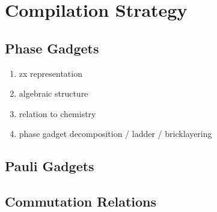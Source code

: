 \chapter{\label{compilation-strategy}Compilation Strategy}

\section{Phase Gadgets}
\begin{enumerate}
    \item zx representation
    \item algebraic structure
    \item relation to chemistry
    \item phase gadget decomposition / ladder / bricklayering
\end{enumerate}

\section{Pauli Gadgets}

\section{Commutation Relations}
